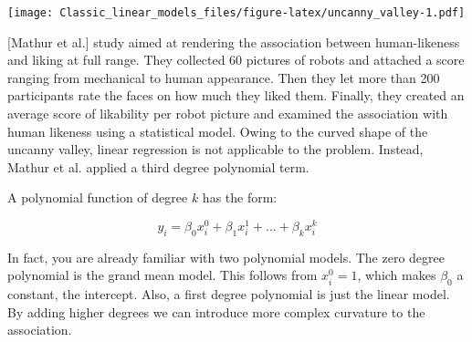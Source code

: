 \documentclass[]{svmono}
\theoremstyle{definition}
\theoremstyle{definition}
\theoremstyle{definition}
\theoremstyle{remark}
\begin{document}
\texttt{[image: Classic\_linear\_models\_files/figure-latex/uncanny\_valley-1.pdf]}

{[}Mathur et al.{]} study aimed at rendering the association between
human-likeness and liking at full range. They collected 60 pictures of
robots and attached a score ranging from mechanical to human appearance.
Then they let more than 200 participants rate the faces on how much they
liked them. Finally, they created an average score of likability per
robot picture and examined the association with human likeness using a
statistical model. Owing to the curved shape of the uncanny valley,
linear regression is not applicable to the problem. Instead, Mathur et
al. applied a third degree polynomial term.

A polynomial function of degree \(k\) has the form:

\[y_i = \beta_0 x_i^0 + \beta_1 x_i^1 + ... + \beta_{k}  x_i^{k}\]

In fact, you are already familiar with two polynomial models. The zero
degree polynomial is the grand mean model. This follows from
\(x_i^0 = 1\), which makes \(\beta_0\) a constant, the intercept. Also,
a first degree polynomial is just the linear model. By adding higher
degrees we can introduce more complex curvature to the association.
\end{document}
